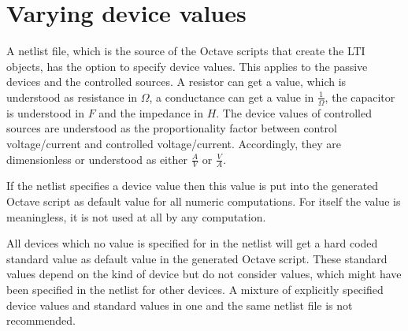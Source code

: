 \section{Varying device values}

A netlist file, which is the source of the Octave scripts that create the
LTI objects, has the option to specify device values. This applies to the
passive devices and the controlled sources. A resistor can get a value,
which is understood as resistance in $\Omega$, a conductance can get a
value in $\frac{1}{\Omega}$, the capacitor is understood in $F$ and the
impedance in $H$. The device values of controlled sources are understood
as the proportionality factor between control voltage/current and controlled
voltage/current. Accordingly, they are dimensionless or understood as
either $\frac{A}{V}$ or $\frac{V}{A}$.

If the netlist specifies a device value then this value is put into the
generated Octave script as default value for all numeric computations. For
\linnet{} itself the value is meaningless, it is not used at all by any
\linnet{} computation.

All devices which no value is specified for in the netlist will get a
hard coded standard value as default value in the generated Octave script.
These standard values depend on the kind of device but do not consider
values, which might have been specified in the netlist for other devices. A
mixture of explicitly specified device values and standard values in one
and the same netlist file is not recommended.

